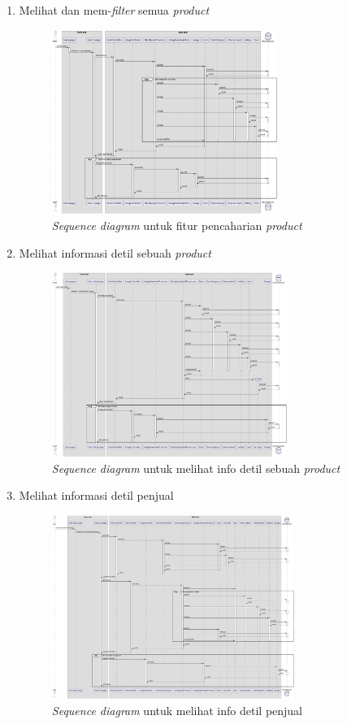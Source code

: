 \documentclass[a4paper]{article}
\begin{document}
\begin{enumerate}
\begin{enumerate}
        \item Melihat dan mem-\textit{filter} semua \textit{product}
        \begin{figure}[h]
            \centering
            \includegraphics*[height=6cm]{./diagram/sequence diagram/9. search item/search item.png}
            \caption{\textit{Sequence diagram} untuk fitur pencaharian \textit{product}}
        \end{figure}
        \item Melihat informasi detil sebuah \textit{product}
        \begin{figure}[h]
            \centering
            \includegraphics*[height=6cm]{./diagram/sequence diagram/10. see item detail/see item detail.png}
            \caption{\textit{Sequence diagram} untuk melihat info detil sebuah \textit{product}}
        \end{figure}
        \newpage

        \item Melihat informasi detil penjual
        \begin{figure}[h]
            \centering
            \includegraphics*[height=6cm]{./diagram/sequence diagram/11.view merchant page/view merchant page.png}
            \caption{\textit{Sequence diagram} untuk melihat info detil penjual}
        \end{figure}


\end{enumerate}
\end{enumerate}
\end{document}
